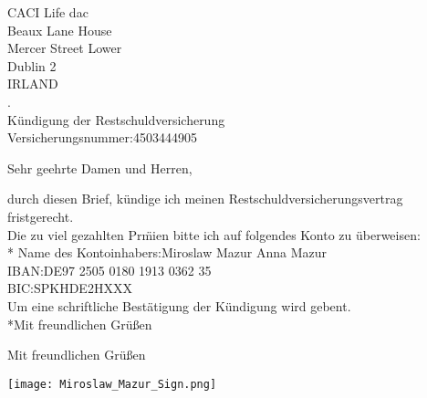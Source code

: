 \documentclass[12pt,a4paper]{letter}
\begin{document}
\begin{letter}{CACI Life dac\\Beaux Lane House\\Mercer Street Lower\\Dublin 2\\IRLAND\\.\\K\"undigung der Restschuldversicherung\\Versicherungsnummer:4503444905}
\opening{Sehr geehrte Damen und Herren,}
durch diesen Brief, k\"undige ich meinen Restschuldversicherungsvertrag fristgerecht.\\
Die zu viel gezahlten Pr\"mien bitte ich auf folgendes Konto zu \"uberweisen:\\*
Name des Kontoinhabers:Miroslaw Mazur Anna Mazur\\
IBAN:DE97 2505 0180 1913 0362 35\\
BIC:SPKHDE2HXXX\\

Um eine schriftliche Best\"atigung der K\"undigung wird gebent. \\*Mit freundlichen Gr\"u\ss en

\closing{Mit freundlichen Gr\"u\ss en}
\texttt{[image: Miroslaw\_Mazur\_Sign.png]}
\end{letter}
\end{document}
